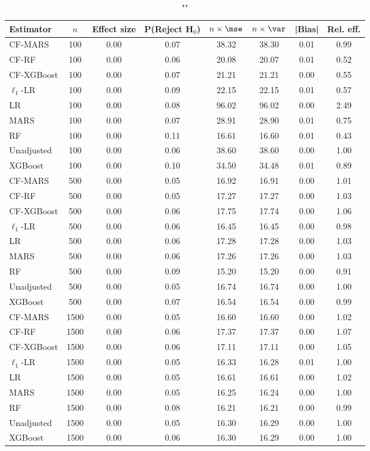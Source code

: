 \begin{table}
\centering
\caption{""}
\begin{tabular}{lccccccc}
\toprule
Estimator & $n$ & Effect size & P(Reject H$_0$) & $n\times\mse$ & $n\times \var$ & |Bias| & Rel. eff.\\ \midrule
CF-MARS & 100 & 0.00 & 0.07 & 38.32 & 38.30 & 0.01 & 0.99 \\ 
CF-RF & 100 & 0.00 & 0.06 & 20.08 & 20.07 & 0.01 & 0.52 \\ 
CF-XGBoost & 100 & 0.00 & 0.07 & 21.21 & 21.21 & 0.00 & 0.55 \\ 
$\ell_1$-LR & 100 & 0.00 & 0.09 & 22.15 & 22.15 & 0.01 & 0.57 \\ 
LR & 100 & 0.00 & 0.08 & 96.02 & 96.02 & 0.00 & 2.49 \\ 
MARS & 100 & 0.00 & 0.07 & 28.91 & 28.90 & 0.01 & 0.75 \\ 
RF & 100 & 0.00 & 0.11 & 16.61 & 16.60 & 0.01 & 0.43 \\ 
Unadjusted & 100 & 0.00 & 0.06 & 38.60 & 38.60 & 0.00 & 1.00 \\ 
XGBoost & 100 & 0.00 & 0.10 & 34.50 & 34.48 & 0.01 & 0.89 \\ \addlinespace 
CF-MARS & 500 & 0.00 & 0.05 & 16.92 & 16.91 & 0.00 & 1.01 \\ 
CF-RF & 500 & 0.00 & 0.05 & 17.27 & 17.27 & 0.00 & 1.03 \\ 
CF-XGBoost & 500 & 0.00 & 0.06 & 17.75 & 17.74 & 0.00 & 1.06 \\ 
$\ell_1$-LR & 500 & 0.00 & 0.06 & 16.45 & 16.45 & 0.00 & 0.98 \\ 
LR & 500 & 0.00 & 0.06 & 17.28 & 17.28 & 0.00 & 1.03 \\ 
MARS & 500 & 0.00 & 0.06 & 17.26 & 17.26 & 0.00 & 1.03 \\ 
RF & 500 & 0.00 & 0.09 & 15.20 & 15.20 & 0.00 & 0.91 \\ 
Unadjusted & 500 & 0.00 & 0.05 & 16.74 & 16.74 & 0.00 & 1.00 \\ 
XGBoost & 500 & 0.00 & 0.07 & 16.54 & 16.54 & 0.00 & 0.99 \\ \addlinespace 
CF-MARS & 1500 & 0.00 & 0.05 & 16.60 & 16.60 & 0.00 & 1.02 \\ 
CF-RF & 1500 & 0.00 & 0.06 & 17.37 & 17.37 & 0.00 & 1.07 \\ 
CF-XGBoost & 1500 & 0.00 & 0.06 & 17.11 & 17.11 & 0.00 & 1.05 \\ 
$\ell_1$-LR & 1500 & 0.00 & 0.05 & 16.33 & 16.28 & 0.01 & 1.00 \\ 
LR & 1500 & 0.00 & 0.05 & 16.61 & 16.61 & 0.00 & 1.02 \\ 
MARS & 1500 & 0.00 & 0.05 & 16.25 & 16.24 & 0.00 & 1.00 \\ 
RF & 1500 & 0.00 & 0.08 & 16.21 & 16.21 & 0.00 & 0.99 \\ 
Unadjusted & 1500 & 0.00 & 0.05 & 16.30 & 16.29 & 0.00 & 1.00 \\ 
XGBoost & 1500 & 0.00 & 0.06 & 16.30 & 16.29 & 0.00 & 1.00 \\
\bottomrule
\end{tabular}
\end{table}

